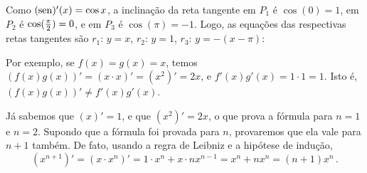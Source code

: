 \begin{Solution}{6.14}
Como $(\operatorname{sen})'(x)=\cos x$, a inclinação da reta tangente em $P_1$ é $\cos(0)=1$,
em $P_2$ é $\cos(\tfrac{\pi}{2})=0$, e em $P_3$ é $\cos(\pi)=-1$. Logo, as
equações das respectivas retas tangentes são $r_1$: $y=x$, $r_2$: $y=1$, $r_3$:
$y=-(x-\pi)$:
\begin{center}
\begin{bmlimage}\end{bmlimage}
\end{center}
\end{Solution}
\begin{Solution}{6.16}
Por exemplo, se $f(x)=g(x)=x$, temos $(f(x)g(x))'=(x\cdot x)'=(x^2)'=2x$,
e $f'(x)g'(x)=1\cdot 1=1$. Isto é, $(f(x)g(x))'\neq f'(x)g'(x)$.
\end{Solution}
\begin{Solution}{6.17}
Já sabemos que $(x)'=1$, e que $(x^2)'=2x$, o que prova a fórmula para $n=1$ e $n=2$.
Supondo que a fórmula foi provada para $n$, provaremos que ela vale para $n+1$
também.
De fato, usando a regra de Leibniz e a hipótese de indução,
\[
(x^{n+1})'=
(x\cdot x^n)'=1\cdot x^n+x\cdot nx^{n-1}=x^n+nx^n=(n+1)x^n\,.
\]
\end{Solution}
